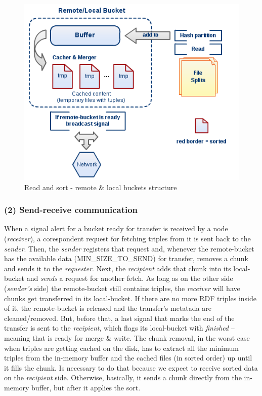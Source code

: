 \begin{figure}
\centering
\includegraphics[scale=0.6]{diag1}
\caption{Read and sort - remote \& local buckets structure}
\end{figure}

% 
\subsubsection*{(2) Send-receive communication}

When a signal alert for a bucket ready for transfer is received by a node (\textit{receiver}), a corespondent request for fetching triples from it is sent back to the \textit{sender}. Then, the \textit{sender} registers that request and, whenever the remote-bucket has the available data (MIN\_SIZE\_TO\_SEND) for transfer, removes a chunk and sends it to the \textit{requester}. Next, the \textit{recipient} adds that chunk into its local-bucket and \textit{sends} a request for another fetch. As long as on the other side (\textit{sender's} side) the remote-bucket still contains triples, the \textit{receiver} will have chunks get transferred in its local-bucket. If there are no more RDF triples inside of it, the remote-bucket is released and the transfer's metatada are cleaned/removed. But, before that, a last signal that marks the end of the transfer is sent to the \textit{recipient}, which flags its local-bucket with \textit{finished} -- meaning that is ready for merge \& write. The chunk removal, in the worst case when triples are getting cached on the disk, has to extract all the minimum triples from the in-memory buffer and the cached files (in sorted order) up until it fills the chunk. Is necessary to do that because we expect to receive sorted data on the \textit{recipient} side. Otherwise, basically, it sends a chunk directly from the in-memory buffer, but after it applies the sort.

